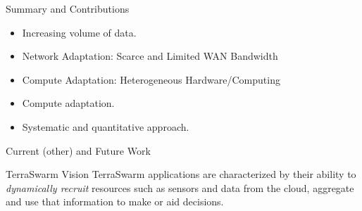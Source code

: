 \begin{frame}{Summary and Contributions}
  \begin{itemize}
  \item Increasing volume of data.
  \item Network Adaptation: Scarce and Limited WAN Bandwidth
  \item Compute Adaptation: Heterogeneous Hardware/Computing
  \item Compute adaptation.
  \item Systematic and quantitative approach.
  \end{itemize}
\end{frame}

\begin{frame}{Current (other) and Future Work}
  \vspace{1em}
  \begin{block}{TerraSwarm Vision}
    TerraSwarm applications are characterized by their ability to
    \textit{dynamically recruit} resources such as sensors and data from the
    cloud, aggregate and use that information to make or aid decisions.
  \end{block}

  \pause
  

\end{frame}
